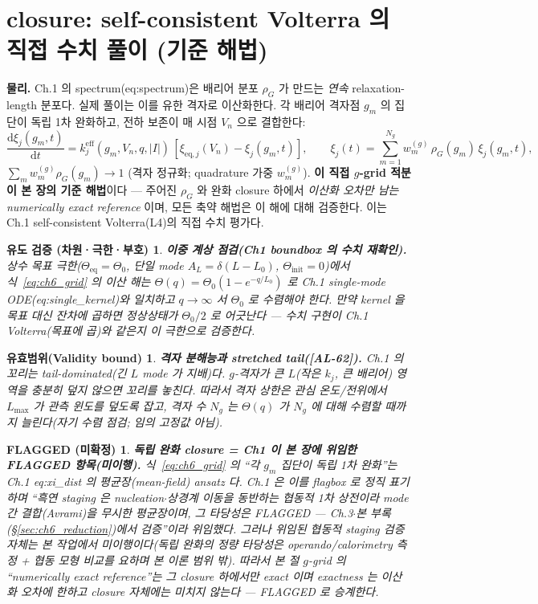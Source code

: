 \documentclass[11pt,a4paper]{article}
\newtheorem*{boundbox}{유효범위(Validity bound)}
\newtheorem*{flagbox}{FLAGGED (미확정)}
\newtheorem*{verifybox}{유도 검증 (차원·극한·부호)}
\newcommand{\dd}{\mathrm{d}}
\newcommand{\eff}{\mathrm{eff}}
\newcommand{\eq}{\mathrm{eq}}
\newcommand{\AL}[1]{\textsf{[AL-#1]}}
\begin{document}
\section{closure: self-consistent Volterra 의 직접 수치 풀이 (기준 해법)}\label{sec:ch6_grid}
\textbf{물리.} Ch.1 의 spectrum(eq:spectrum)은 배리어 분포 $\rho_G$ 가 만드는 \emph{연속} relaxation-length 분포다.
실제 풀이는 이를 유한 격자로 이산화한다. 각 배리어 격자점 $g_m$ 의 집단이 독립 1차 완화하고, 전하 보존이 매
시점 $V_n$ 으로 결합한다:
\begin{equation}
\frac{\dd\xi_j(g_m,t)}{\dd t}=k_j^{\eff}(g_m,V_n,q,|I|)\,[\xi_{\eq,j}(V_n)-\xi_j(g_m,t)],\qquad
\xi_j(t)=\sum_{m=1}^{N_g}w_m^{(g)}\,\rho_G(g_m)\,\xi_j(g_m,t),
\label{eq:ch6_grid}
\end{equation}
$\sum_m w_m^{(g)}\rho_G(g_m)\to1$ (격자 정규화; quadrature 가중 $w_m^{(g)}$). \textbf{이 직접 $g$-grid 적분이 본
장의 기준 해법}이다 — 주어진 $\rho_G$ 와 완화 closure 하에서 \emph{이산화 오차만 남는 numerically exact reference}
이며, 모든 축약 해법은 이 해에 대해 검증한다. 이는 Ch.1 self-consistent Volterra(L4)의 직접 수치 평가다.
\begin{verifybox}
\textbf{이중 계상 점검(Ch1 boundbox 의 수치 재확인).} 상수 목표 극한($\Theta_\eq=\Theta_0$, 단일 mode
$A_L=\delta(L-L_0)$, $\Theta_\mathrm{init}=0$)에서 식~\eqref{eq:ch6_grid} 의 이산 해는 $\Theta(q)=\Theta_0
(1-e^{-q/L_0})$ 로 Ch.1 single-mode ODE(eq:single\_kernel)와 일치하고 $q\to\infty$ 서 $\Theta_0$ 로 수렴해야
한다. 만약 kernel 을 \emph{목표} 대신 \emph{잔차}에 곱하면 정상상태가 $\Theta_0/2$ 로 어긋난다 — 수치 구현이
Ch.1 Volterra(목표에 곱)와 같은지 이 극한으로 검증한다.
\end{verifybox}
\begin{boundbox}
\textbf{격자 분해능과 stretched tail(\AL{62}).} Ch.1 의 꼬리는 \emph{tail-dominated}(긴 $L$ mode 가 지배)다.
$g$-격자가 큰 $L$(작은 $k_j$, 큰 배리어) 영역을 충분히 덮지 않으면 꼬리를 놓친다. 따라서 격자 상한은 관심
온도/전위에서 $L_{\max}$ 가 관측 윈도를 덮도록 잡고, 격자 수 $N_g$ 는 $\Theta(q)$ 가 $N_g$ 에 대해 수렴할 때까지
늘린다(자기 수렴 점검; 임의 고정값 아님).
\end{boundbox}
\begin{flagbox}
\textbf{독립 완화 closure = Ch1 이 본 장에 위임한 FLAGGED 항목(미이행).} 식~\eqref{eq:ch6_grid} 의 ``각 $g_m$ 집단이
\emph{독립} 1차 완화''는 Ch.1 eq:xi\_dist 의 평균장(mean-field) ansatz 다. Ch.1 은 이를 flagbox 로 정직 표기하며
``흑연 staging 은 nucleation$\cdot$상경계 이동을 동반하는 \emph{협동적} 1차 상전이라 mode 간 결합(Avrami)을 무시한
평균장이며, 그 타당성은 FLAGGED — Ch.3$\cdot$본 부록(§\ref{sec:ch6_reduction})에서 검증''이라 위임했다. 그러나 위임된 \emph{협동적
staging 검증 자체는 본 작업에서 미이행}이다(독립 완화의 정량 타당성은 operando/calorimetry 측정 + 협동 모형 비교를
요하며 본 이론 범위 밖). 따라서 본 절 $g$-grid 의 ``numerically exact reference''는 그 closure \emph{하에서만}
exact 이며 \emph{exactness 는 이산화 오차에 한하고 closure 자체에는 미치지 않는다} — FLAGGED 로 승계한다.
\end{flagbox}
\end{document}
